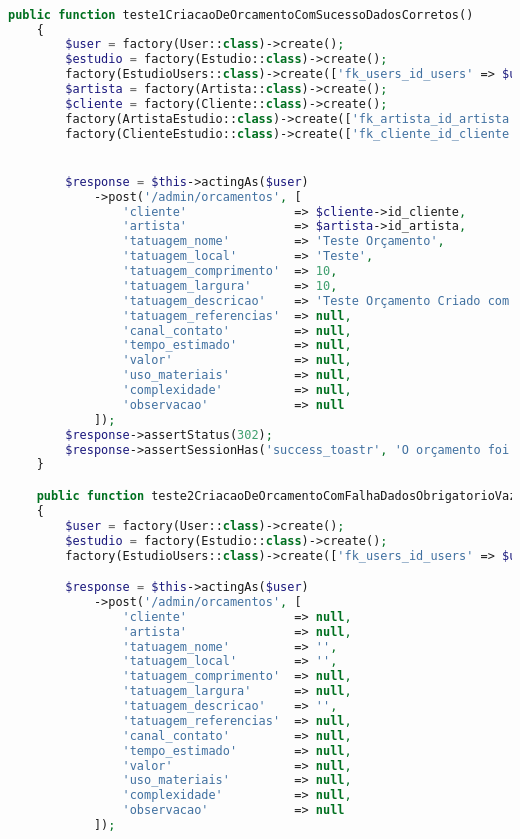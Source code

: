 \begin{lstlisting}[language=PHP, caption= Script de testes \textbf{teste1CriacaoDeOrcamentoComSucessoDadosCorretos} e \textbf{teste2CriacaoDeOrcamentoComFalhaDadosObrigatorioVazios}  que testam a criação de orçamentos com sucesso e falha respectivamente, label={code:CriacaoDeOrcamentoTest1E2}]

public function teste1CriacaoDeOrcamentoComSucessoDadosCorretos()
    {
        $user = factory(User::class)->create();
        $estudio = factory(Estudio::class)->create();
        factory(EstudioUsers::class)->create(['fk_users_id_users' => $user->id, 'fk_estudio_id_estudio' => $estudio->id_estudio]);
        $artista = factory(Artista::class)->create();
        $cliente = factory(Cliente::class)->create();
        factory(ArtistaEstudio::class)->create(['fk_artista_id_artista' => $artista->id_artista, 'fk_estudio_id_estudio' => $estudio->id_estudio]);
        factory(ClienteEstudio::class)->create(['fk_cliente_id_cliente' => $cliente->id_cliente, 'fk_estudio_id_estudio' => $estudio->id_estudio]);


        $response = $this->actingAs($user)
            ->post('/admin/orcamentos', [
                'cliente'               => $cliente->id_cliente,
                'artista'               => $artista->id_artista,
                'tatuagem_nome'         => 'Teste Orçamento',
                'tatuagem_local'        => 'Teste',
                'tatuagem_comprimento'  => 10,
                'tatuagem_largura'      => 10,
                'tatuagem_descricao'    => 'Teste Orçamento Criado com Sucesso!',
                'tatuagem_referencias'  => null,
                'canal_contato'         => null,
                'tempo_estimado'        => null,
                'valor'                 => null,
                'uso_materiais'         => null,
                'complexidade'          => null,
                'observacao'            => null
            ]);
        $response->assertStatus(302);
        $response->assertSessionHas('success_toastr', 'O orçamento foi cadastrado com sucesso!');
    }

    public function teste2CriacaoDeOrcamentoComFalhaDadosObrigatorioVazios()
    {
        $user = factory(User::class)->create();
        $estudio = factory(Estudio::class)->create();
        factory(EstudioUsers::class)->create(['fk_users_id_users' => $user->id, 'fk_estudio_id_estudio' => $estudio->id_estudio]);

        $response = $this->actingAs($user)
            ->post('/admin/orcamentos', [
                'cliente'               => null,
                'artista'               => null,
                'tatuagem_nome'         => '',
                'tatuagem_local'        => '',
                'tatuagem_comprimento'  => null,
                'tatuagem_largura'      => null,
                'tatuagem_descricao'    => '',
                'tatuagem_referencias'  => null,
                'canal_contato'         => null,
                'tempo_estimado'        => null,
                'valor'                 => null,
                'uso_materiais'         => null,
                'complexidade'          => null,
                'observacao'            => null
            ]);


\end{lstlisting}
